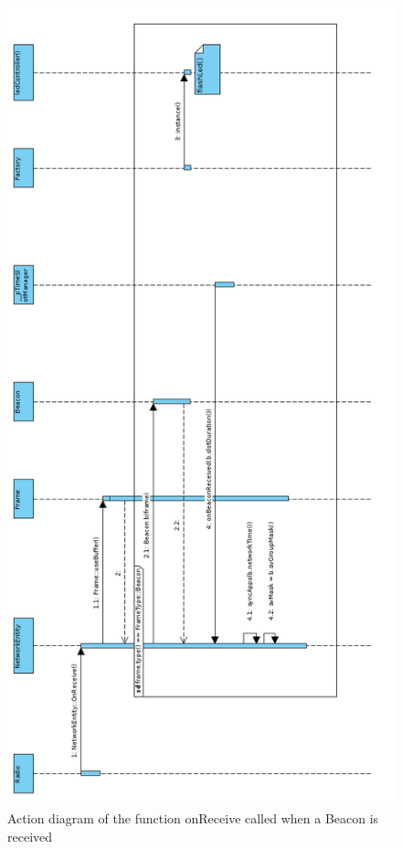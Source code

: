 \begin{figure}[H]
	\centering
	\includegraphics[height=\textheight]{images/onReceive_rotated.png}
	\caption{Action diagram of the function onReceive called when a Beacon is received}
	\label{fig:onReceive}
\end{figure}

